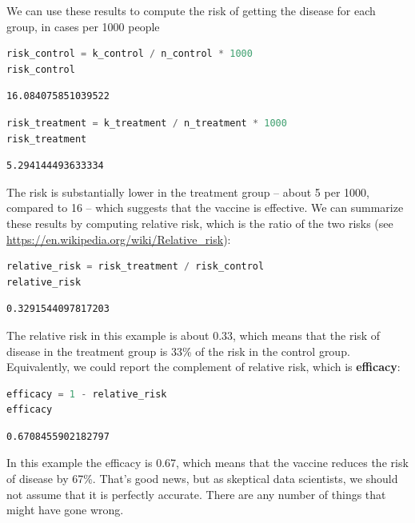 We can use these results to compute the risk of getting the disease for
each group, in cases per 1000 people

\begin{lstlisting}[language=Python,style=source]
risk_control = k_control / n_control * 1000
risk_control
\end{lstlisting}

\begin{lstlisting}[style=output]
16.084075851039522
\end{lstlisting}

\begin{lstlisting}[language=Python,style=source]
risk_treatment = k_treatment / n_treatment * 1000
risk_treatment
\end{lstlisting}

\begin{lstlisting}[style=output]
5.294144493633334
\end{lstlisting}

The risk is substantially lower in the treatment group -- about 5 per
1000, compared to 16 -- which suggests that the vaccine is effective. We
can summarize these results by computing relative risk, which is the
ratio of the two risks (see
\url{https://en.wikipedia.org/wiki/Relative_risk}):

\begin{lstlisting}[language=Python,style=source]
relative_risk = risk_treatment / risk_control
relative_risk
\end{lstlisting}

\begin{lstlisting}[style=output]
0.3291544097817203
\end{lstlisting}

The relative risk in this example is about 0.33, which means that the
risk of disease in the treatment group is 33\% of the risk in the
control group. Equivalently, we could report the complement of relative
risk, which is \textbf{efficacy}:

\begin{lstlisting}[language=Python,style=source]
efficacy = 1 - relative_risk
efficacy
\end{lstlisting}

\begin{lstlisting}[style=output]
0.6708455902182797
\end{lstlisting}

In this example the efficacy is 0.67, which means that the vaccine
reduces the risk of disease by 67\%. That's good news, but as skeptical
data scientists, we should not assume that it is perfectly accurate.
There are any number of things that might have gone wrong.

